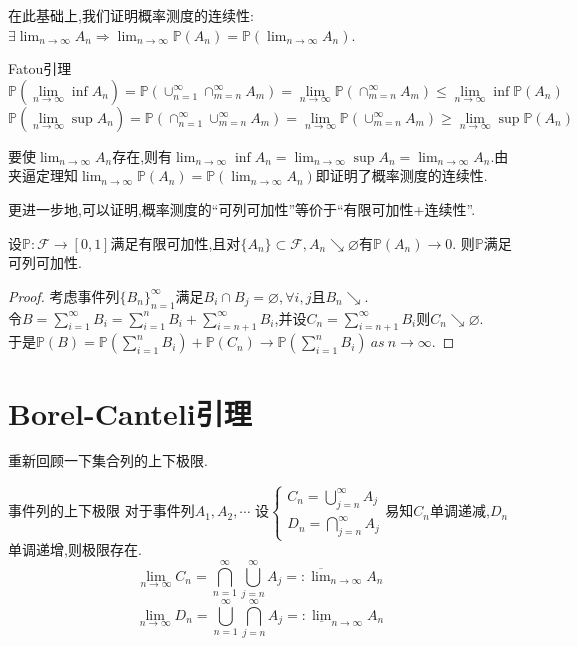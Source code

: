 \documentclass[lang=cn,10pt]{elegantbook}
\begin{document}
在此基础上,我们证明概率测度的连续性:$\exists\lim_{n\to\infty}A_n\Rightarrow\lim_{n\to\infty}\mathbb{P}(A_n)=\mathbb{P}(\lim_{n\to\infty}A_n)$.
\begin{lemma}{Fatou引理}{}
    $$\mathbb{P}(\lim_{n\to\infty}\inf A_n)=\mathbb{P}(\cup_{n=1}^{\infty}\cap_{m=n}^{\infty}A_m)=\lim_{n\to\infty}\mathbb{P}(\cap_{m=n}^{\infty}A_m)\leq\lim_{n\to\infty}\inf \mathbb{P}(A_n)$$
    $$\mathbb{P}(\lim_{n\to\infty}\sup A_n)=\mathbb{P}(\cap_{n=1}^{\infty}\cup_{m=n}^{\infty}A_m)=\lim_{n\to\infty}\mathbb{P}(\cup_{m=n}^{\infty}A_m)\geq\lim_{n\to\infty}\sup \mathbb{P}(A_n)$$
\end{lemma}
\noindent 要使$\lim_{n\to\infty}A_n$存在,则有$\lim_{n\to\infty}\inf A_n=\lim_{n\to\infty}\sup A_n=\lim_{n\to\infty}A_n$.由夹逼定理知$\lim_{n\to\infty}\mathbb{P}(A_n)=\mathbb{P}(\lim_{n\to\infty}A_n)$即证明了概率测度的连续性.

更进一步地,可以证明,概率测度的“可列可加性”等价于“有限可加性+连续性”.
\begin{proposition}
    设$\mathbb{P}:\mathcal{F}\to[0,1]$满足有限可加性,且对$\{A_n\}\subset \mathcal{F},A_n\searrow \varnothing$有$\mathbb{P}(A_n)\to 0$.
    则$\mathbb{P}$满足可列可加性.
\end{proposition}
\begin{proof}
    考虑事件列$\{B_n\}_{n=1}^{\infty}$满足$B_i\cap B_j=\varnothing,\forall i,j$且$B_n\searrow $.\\
    令$B=\sum_{i=1}^{\infty}B_i=\sum_{i=1}^{n}B_i+\sum_{i=n+1}^{\infty}B_i$,并设$C_n=\sum_{i=n+1}^{\infty}B_i$则$C_n\searrow\varnothing$.\\
    于是$\mathbb{P}(B)=\mathbb{P}(\sum_{i=1}^{n}B_i)+\mathbb{P}(C_n)\to\mathbb{P}(\sum_{i=1}^{n}B_i)\ as\ n\to\infty$.
\end{proof}
\section{Borel-Canteli引理}
重新回顾一下集合列的上下极限.
\begin{definition}{事件列的上下极限}{}
    对于事件列$A_1,A_2,\cdots$
    设$\left\{\begin{aligned}C_n=\bigcup_{j=n}^{\infty}A_j\\D_n=\bigcap_{j=n}^{\infty}A_j\end{aligned}\right.$易知$C_n$单调递减,$D_n$单调递增,则极限存在.
   $$\lim_{n\to\infty}C_n=\bigcap_{n=1}^{\infty}\bigcup_{j=n}^{\infty}A_j=:\overline{\lim}_{n\to \infty}A_n$$ 
   $$\lim_{n\to\infty}D_n=\bigcup_{n=1}^{\infty}\bigcap_{j=n}^{\infty}A_j=:\underline{\lim}_{n\to\infty}A_n$$
\end{definition}
\end{document}
